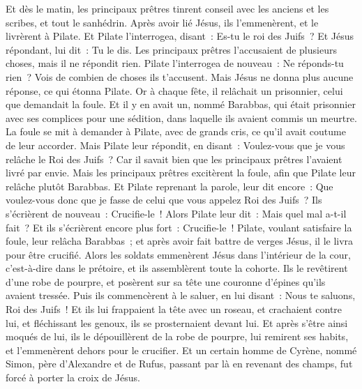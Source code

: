 \begin{multicols}{2}
\VerseOne{}Et dès le matin, les principaux prêtres tinrent conseil avec les anciens et les scribes, et tout le sanhédrin. Après avoir lié Jésus, ils l'emmenèrent, et le livrèrent à Pilate.
Et Pilate l'interrogea, disant~: Es-tu le roi des Juifs~? Et Jésus répondant, lui dit~: Tu le dis.
Les principaux prêtres l'accusaient de plusieurs choses, mais il ne répondit rien.
Pilate l'interrogea de nouveau~: Ne réponds-tu rien~? Vois de combien de choses ils t'accusent.
Mais Jésus ne donna plus aucune réponse, ce qui étonna Pilate.
Or à chaque fête, il relâchait un prisonnier, celui que demandait la foule.
Et il y en avait un, nommé Barabbas, qui était prisonnier avec ses complices pour une sédition, dans laquelle ils avaient commis un meurtre.
La foule se mit à demander à Pilate, avec de grands cris, ce qu'il avait coutume de leur accorder.
Mais Pilate leur répondit, en disant~: Voulez-vous que je vous relâche le Roi des Juifs~?
Car il savait bien que les principaux prêtres l'avaient livré par envie.
Mais les principaux prêtres excitèrent la foule, afin que Pilate leur relâche plutôt Barabbas.
Et Pilate reprenant la parole, leur dit encore~: Que voulez-vous donc que je fasse de celui que vous appelez Roi des Juifs~?
Ils s'écrièrent de nouveau~: Crucifie-le~!
Alors Pilate leur dit~: Mais quel mal a-t-il fait~? Et ils s'écrièrent encore plus fort~: Crucifie-le~!
Pilate, voulant satisfaire la foule, leur relâcha Barabbas~; et après avoir fait battre de verges Jésus, il le livra pour être crucifié.
Alors les soldats emmenèrent Jésus dans l'intérieur de la cour, c'est-à-dire dans le prétoire, et ils assemblèrent toute la cohorte.
Ils le revêtirent d'une robe de pourpre, et posèrent sur sa tête une couronne d'épines qu'ils avaient tressée.
Puis ils commencèrent à le saluer, en lui disant~: Nous te saluons, Roi des Juifs~!
Et ils lui frappaient la tête avec un roseau, et crachaient contre lui, et fléchissant les genoux, ils se prosternaient devant lui.
Et après s'être ainsi moqués de lui, ils le dépouillèrent de la robe de pourpre, lui remirent ses habits, et l'emmenèrent dehors pour le crucifier.
Et un certain homme de Cyrène, nommé Simon, père d'Alexandre et de Rufus, passant par là en revenant des champs, fut forcé à porter la croix de Jésus.

\end{multicols}
